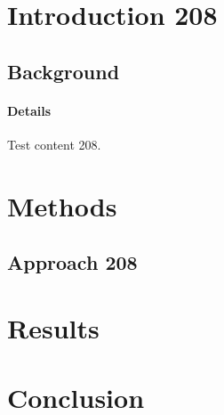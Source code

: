 \documentclass{article}
\begin{document}
\section{Introduction 208}
\subsection{Background}
\paragraph{Details} Test content 208.
\section{Methods}
\subsection{Approach 208}
\section{Results}
\section{Conclusion}
\end{document}
